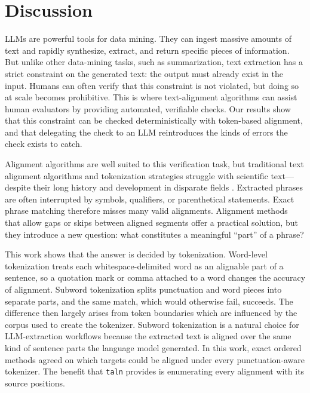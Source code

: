 \documentclass[10pt,twocolumn]{article}
\theoremstyle{plain}
\theoremstyle{definition}
\theoremstyle{remark}
\begin{document}
\balance

\section{Discussion}
LLMs are powerful tools for data mining. They can ingest massive amounts of text and rapidly synthesize, extract, and return specific pieces of information. But unlike other data-mining tasks, such as summarization, text extraction has a strict constraint on the generated text: the output must already exist in the input. Humans can often verify that this constraint is not violated, but doing so at scale becomes prohibitive. This is where text-alignment algorithms can assist human evaluators by providing automated, verifiable checks. Our results show that this constraint can be checked deterministically with token-based alignment, and that delegating the check to an LLM reintroduces the kinds of errors the check exists to catch.

Alignment algorithms are well suited to this verification task, but traditional text alignment algorithms and tokenization strategies struggle with scientific text---despite their long history and development in disparate fields \citep{hirschberg1975lcs, KnuthMorrisPratt1977, Melsted2021, sennrich2016neuralmachinetranslationrare, Sullivan2025}. Extracted phrases are often interrupted by symbols, qualifiers, or parenthetical statements. Exact phrase matching therefore misses many valid alignments. Alignment methods that allow gaps or skips between aligned segments offer a practical solution, but they introduce a new question: what constitutes a meaningful ``part'' of a phrase?

This work shows that the answer is decided by tokenization. Word-level tokenization treats each whitespace-delimited word as an alignable part of a sentence, so a quotation mark or comma attached to a word changes the accuracy of alignment. Subword tokenization splits punctuation and word pieces into separate parts, and the same match, which would otherwise fail, succeeds. The difference then largely arises from token boundaries which are influenced by the corpus used to create the tokenizer. Subword tokenization is a natural choice for LLM-extraction workflows because the extracted text is aligned over the same kind of sentence parts the language model generated. In this work, exact ordered methods agreed on which targets could be aligned under every punctuation-aware tokenizer. The benefit that \texttt{taln} provides is enumerating every alignment with its source positions.
\end{document}
